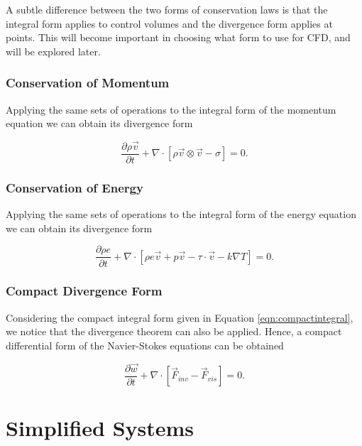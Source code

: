 \begin{remark}
A subtle difference between the two forms of conservation laws is that the integral form applies to control volumes and the divergence form applies at points. This will become important in choosing what form to use for CFD, and will be explored later.
\end{remark}

\subsection{Conservation of Momentum}
Applying the same sets of operations to the integral form of the momentum equation we can obtain its divergence form
\begin{eqBox}
\begin{equation}
	 \frac{\partial \rho \vec{v}}{\partial t} + \nabla \cdot \left[ \rho \vec{v} \otimes \vec{v} - \sigma \right] =  0.
\end{equation}
\end{eqBox}

\subsection{Conservation of Energy}
Applying the same sets of operations to the integral form of the energy equation we can obtain its divergence form
\begin{eqBox}
\begin{equation}
\frac{\partial \rho e}{\partial t} + \nabla \cdot \left[ \rho e \vec{v} + p\vec{v} - \tau \cdot \vec{v} - k \nabla T \right] = 0.
\end{equation}
\end{eqBox}

\subsection{Compact Divergence Form}
Considering the compact integral form given in Equation \ref{eqn:compactintegral}, we notice that the divergence theorem can also be applied. Hence, a compact differential form of the Navier-Stokes equations can be obtained
\begin{eqBox}
\begin{equation}
\frac{\partial \vec{w}}{\partial t} + \nabla \cdot \left[\vec{F}_{inv} - \vec{F}_{vis}\right] = 0.
\end{equation}
\end{eqBox}

\chapter{Simplified Systems}

